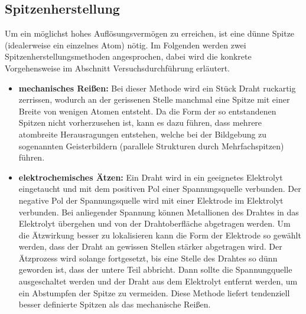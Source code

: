 \documentclass[10pt, a4paper]{article}
\begin{document}
\subsection{Spitzenherstellung}
Um ein möglichst hohes Auflösungsvermögen zu erreichen, ist eine dünne Spitze (idealerweise ein einzelnes Atom) nötig.
Im Folgenden werden zwei Spitzenherstellungsmethoden angesprochen, dabei wird die konkrete Vorgehensweise im Abschnitt Versuchsdurchführung erläutert.

\begin{itemize}
\item \textbf{mechanisches Reißen:} Bei dieser Methode wird ein Stück Draht ruckartig zerrissen, wodurch an der gerissenen Stelle manchmal eine Spitze mit einer Breite von wenigen Atomen entsteht.
Da die Form  der so entstandenen Spitzen nicht vorherzusehen ist, kann es dazu führen, dass mehrere atombreite Herausragungen entstehen, welche bei der Bildgebung zu sogenannten Geisterbildern (parallele Strukturen durch Mehrfachspitzen) führen.

\item \textbf{elektrochemisches Ätzen:} Ein Draht wird in ein geeignetes Elektrolyt eingetaucht und mit dem positiven Pol einer Spannungsquelle verbunden.
Der negative Pol der Spannungsquelle wird mit einer Elektrode im Elektrolyt verbunden.
Bei anliegender Spannung können Metallionen des Drahtes in das Elektrolyt übergehen und von der Drahtoberfläche abgetragen werden.
Um die Ätzwirkung besser zu lokalisieren kann die Form der Elektrode so gewählt werden, dass der Draht an gewissen Stellen stärker abgetragen wird.
Der Ätzprozess wird solange fortgesetzt, bis eine Stelle des Drahtes so dünn geworden ist, dass der untere Teil abbricht.
Dann sollte die Spannungquelle ausgeschaltet werden und der Draht aus dem Elektrolyt entfernt werden, um ein Abstumpfen der Spitze zu vermeiden.
Diese Methode liefert tendenziell besser definierte Spitzen als das mechanische Reißen.
\end{itemize}
\end{document}

